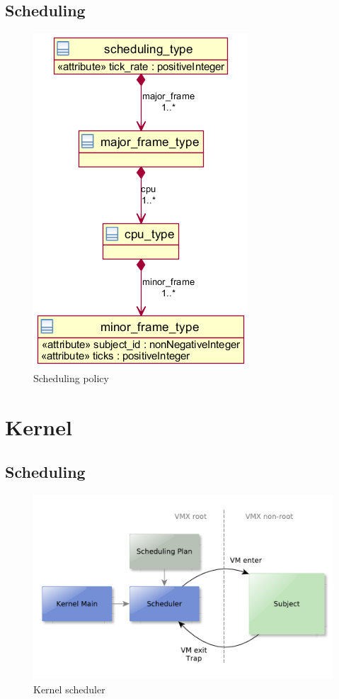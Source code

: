 \subsection{Scheduling}
\begin{figure}[h]
	\centering
	\includegraphics[scale=0.6]{images/xml_scheduling.png}
	\caption{Scheduling policy}
\end{figure}


\section{Kernel}
\subsection{Scheduling}
\begin{figure}[h]
	\centering
	\includegraphics[scale=0.6]{images/scheduler-overview}
	\caption{Kernel scheduler}
	\label{fig:scheduler-overview}
\end{figure}

